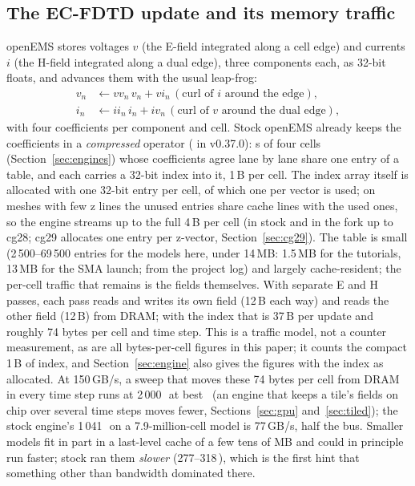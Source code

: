 \subsection{The EC-FDTD update and its memory traffic}
openEMS stores voltages $v$ (the E-field integrated along a cell edge) and currents $i$ (the H-field integrated along
a dual edge), three components each, as 32-bit floats, and advances them with the usual leap-frog:
\begin{align}
v_n &\leftarrow vv_n\, v_n + vi_n\,(\text{curl of } i \text{ around the edge}), \\
i_n &\leftarrow ii_n\, i_n + iv_n\,(\text{curl of } v \text{ around the dual edge}),
\end{align}
with four coefficients per component and cell. Stock openEMS already keeps the coefficients in a \emph{compressed}
operator ( in v0.37.0): s of four cells (Section~\ref{sec:engines})
whose coefficients agree lane by lane share one entry of a table, and each  carries a 32-bit index
into it, 1\,B per cell. The index array itself is allocated with one 32-bit entry per cell, of which one per vector
is used; on meshes with few z lines the unused entries share cache lines with the used ones, so the engine streams up
to the full 4\,B per cell (in stock and in the fork up to cg28; cg29 allocates one entry per z-vector,
Section~\ref{sec:cg29}). The table is small (2\,500--69\,500 entries for the models here, under 14\,MB: 1.5\,MB for
the tutorials, 13\,MB for the SMA launch; from the project log) and largely cache-resident; the per-cell traffic that
remains is the fields themselves. With separate E and H passes, each pass reads and writes its own field (12\,B each
way) and reads the other field (12\,B) from DRAM; with the index that is 37\,B per update and roughly 74 bytes per
cell and time step. This is a traffic model, not a counter measurement, as are all bytes-per-cell figures in this
paper; it counts the compact 1\,B of index, and Section~\ref{sec:engine} also gives the figures with the index as
allocated. At 150\,GB/s, a sweep that moves these 74 bytes per cell from DRAM in every time step runs at
2\,000\,\MC\ at best~\cite{roofline} (an engine that keeps a tile's fields on chip over several time steps moves fewer,
Sections~\ref{sec:gpu} and~\ref{sec:tiled}); the stock engine's 1\,041\,\MC\ on a 7.9-million-cell model is 77\,GB/s, half the bus.
Smaller models fit in part in a last-level cache
of a few tens of MB and could in principle run faster; stock ran them \emph{slower} (277--318\,\MC), which is the
first hint that something other than bandwidth dominated there.

